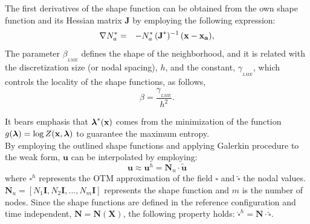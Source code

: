 \documentclass[applsci,journal,article,submit,moreauthors,pdftex]{Definitions/mdpi}
\begin{document}
The first derivatives of the shape function can be obtained from the own shape function and its Hessian matrix \textbf{J} by employing the following expression:
\begin{eqnarray}
\nabla N^*_a &=& -N^*_a \,  (\textbf{J}^*)^{-1} \,  (\bf x-x_a) \label{eq_N3} ,
\end{eqnarray}
The parameter $\beta_{_{LME}}$ defines the shape of the neighborhood, and it is related with the discretization size (or nodal spacing), $h$,  and the constant, $\gamma_{_{LME}}$, which controls the locality of the shape functions, as follows,
\begin{equation}\label{eqLM3}
\beta=\frac{\gamma_{_{LME}}}{h^2}.
\end{equation} 

It bears emphasis that $\boldsymbol{\lambda}^*(\bf x)$ comes from the minimization of the function $g(\boldsymbol{\lambda})=\log Z(\bf x, \boldsymbol{\lambda})$ to guarantee the maximum entropy.\\

By employing the outlined shape functions and applying Galerkin procedure to the weak form, $\boldsymbol{u}$ can be interpolated by employing:
\begin{equation} \label{eq_uwp1}
\boldsymbol{u} \approx  \boldsymbol{u}^h = \boldsymbol{N}_u \cdot \tilde{ \boldsymbol{u} }
\end{equation}
where $\square^h$ represents the OTM approximation of the field $\square$ and $\tilde{ \square } $ the nodal values.  $\boldsymbol{N}_u = [N_1 \boldsymbol{I}, N_2 \boldsymbol{I}, ..., N_m \boldsymbol{I}]$ represents the shape function and $m$ is the number of nodes. Since the shape functions are defined in the reference configuration and time independent, $\boldsymbol{N} = \boldsymbol{N}(\boldsymbol{X})$, the following property holds:  $\dot{\square}^h =\boldsymbol{N} \cdot \dot{\tilde{\square}}$.
  
\end{document}
